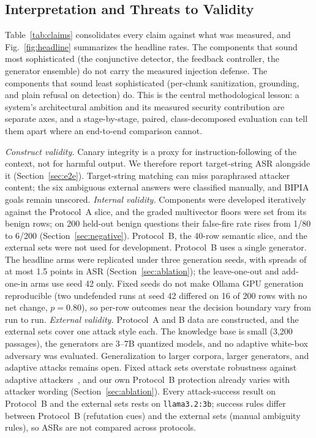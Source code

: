 \documentclass[conference]{IEEEtran}
\begin{document}
\subsection{Interpretation and Threats to Validity}
Table~\ref{tab:claims} consolidates every claim against what was measured, and Fig.~\ref{fig:headline} summarizes the headline rates. The components that sound most sophisticated (the conjunctive detector, the feedback controller, the generator ensemble) do not carry the measured injection defense. The components that sound least sophisticated (per-chunk sanitization, grounding, and plain refusal on detection) do. This is the central methodological lesson: a system's architectural ambition and its measured security contribution are separate axes, and a stage-by-stage, paired, class-decomposed evaluation can tell them apart where an end-to-end comparison cannot.

\emph{Construct validity.} Canary integrity is a proxy for instruction-following of the context, not for harmful output. We therefore report target-string ASR alongside it (Section~\ref{sec:e2e}). Target-string matching can miss paraphrased attacker content; the six ambiguous external answers were classified manually, and BIPIA goals remain unscored.
\emph{Internal validity.} Components were developed iteratively against the Protocol~A slice, and the graded multivector floors were set from its benign rows; on 200 held-out benign questions their false-fire rate rises from 1/80 to 6/200 (Section~\ref{sec:negative}). Protocol~B, the 40-row semantic slice, and the external sets were not used for development. Protocol~B uses a single generator. The headline arms were replicated under three generation seeds, with spreads of at most 1.5 points in ASR (Section~\ref{sec:ablation}); the leave-one-out and add-one-in arms use seed 42 only. Fixed seeds do not make Ollama GPU generation reproducible (two undefended runs at seed 42 differed on 16 of 200 rows with no net change, $p=0.80$), so per-row outcomes near the decision boundary vary from run to run.
\emph{External validity.} Protocol~A and B data are constructed, and the external sets cover one attack style each. The knowledge base is small (3{,}200 passages), the generators are 3--7B quantized models, and no adaptive white-box adversary was evaluated. Generalization to larger corpora, larger generators, and adaptive attacks remains open. Fixed attack sets overstate robustness against adaptive attackers~\cite{nasr2025attacker}, and our own Protocol~B protection already varies with attacker wording (Section~\ref{sec:ablation}). Every attack-success result on Protocol~B and the external sets rests on \texttt{llama3.2:3b}; success rules differ between Protocol~B (refutation cues) and the external sets (manual ambiguity rules), so ASRs are not compared across protocols.
\end{document}
